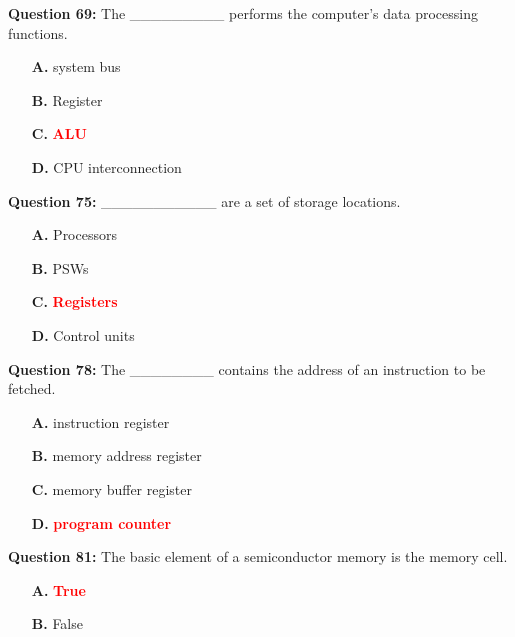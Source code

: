 \documentclass[12pt,a4paper]{article}
\begin{document}
\vspace{0.5cm}

\textbf{Question 69:} The _________ performs the computer's data processing functions.

\begin{itemize}
    \item[\textbf{A.}] system bus
    \item[\textbf{B.}] Register
    \item[\textbf{C.}] \textcolor{red}{\textbf{ALU}}
    \item[\textbf{D.}] CPU interconnection
\end{itemize}

\vspace{0.5cm}

\textbf{Question 75:} ___________ are a set of storage locations.

\begin{itemize}
    \item[\textbf{A.}] Processors
    \item[\textbf{B.}] PSWs
    \item[\textbf{C.}] \textcolor{red}{\textbf{Registers}}
    \item[\textbf{D.}] Control units
\end{itemize}

\vspace{0.5cm}

\textbf{Question 78:} The ________ contains the address of an instruction to be fetched.

\begin{itemize}
    \item[\textbf{A.}] instruction register
    \item[\textbf{B.}] memory address register
    \item[\textbf{C.}] memory buffer register
    \item[\textbf{D.}] \textcolor{red}{\textbf{program counter}}
\end{itemize}

\vspace{0.5cm}

\textbf{Question 81:} The basic element of a semiconductor memory is the memory cell.

\begin{itemize}
    \item[\textbf{A.}] \textcolor{red}{\textbf{True}}
    \item[\textbf{B.}] False
\end{itemize}
\end{document}
